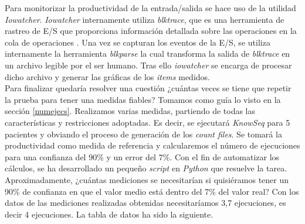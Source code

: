 Para monitorizar la productividad de la entrada/salida se hace uso de la utilidad \textit{Iowatcher}. \textit{Iowatcher} internamente utiliza \textit{blktrace}, que es una herramienta de rastreo de E/S que proporciona información detallada sobre las operaciones en la cola de operaciones \cite{blktrace}. Una vez se capturan los eventos de la E/S, se utiliza internamente la herramienta \textit{blkparse} la cual transforma la salida de \textit{blktrace} en un archivo legible por el ser humano. Tras ello \textit{iowatcher} se encarga de procesar dicho archivo y generar las gráficas de los \textit{items} medidos.\\

Para finalizar quedaría resolver una cuestión ¿cuántas veces se tiene que repetir la prueba para tener una medidas fiables? Tomamos como guía lo visto en la sección \ref{numejecs}. Realizamos varias medidas, partiendo de todas las características y restricciones adoptadas. Es decir, se ejecutará \textit{KnowSeq} para 5 pacientes y obviando el proceso de generación de los \textit{count files}. Se tomará la productividad como medida de referencia y calcularemos el número de ejecuciones para una confianza del 90\% y un error del 7\%. Con el fin de automatizar los cálculos, se ha desarrollado un pequeño \textit{script} en \textit{Python} que resuelve la tarea.\\

Aproximadamente, ¿cuántas mediciones se necesitarían si quisiéramos tener un 90\% de confianza en que el valor medio está dentro del 7\% del valor real? Con los datos de las mediciones realizadas obtenidas necesitaríamos 3,7 ejecuciones, es decir 4 ejecuciones. La tabla de datos ha sido la siguiente.

\begin{table}[h]
    \centering
    \caption{Productividad y número de ejecuciones necesarias para KnowSeq}
    \label{tab:my_label}
\end{table}
\begin{table}[h]
    \centering
\end{table}

